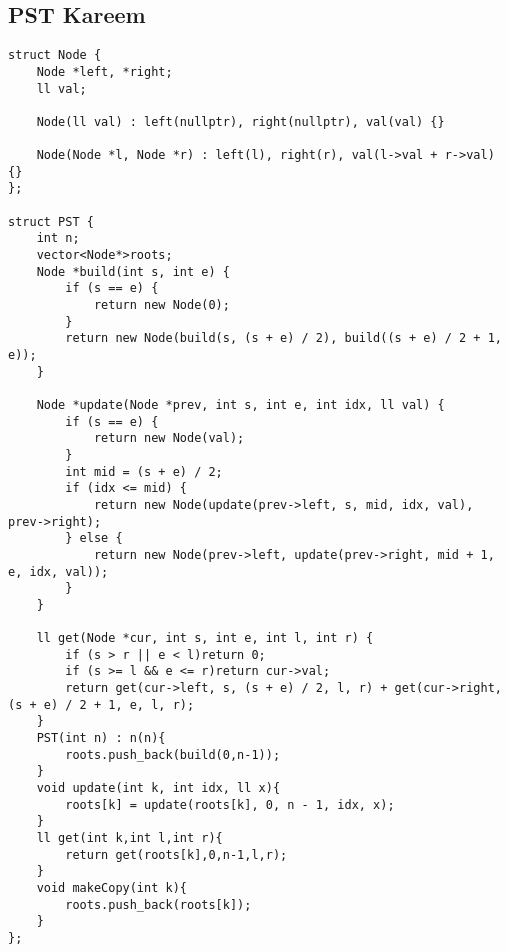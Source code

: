 \documentclass{article}
\begin{document}
\subsection{PST Kareem}
\begin{verbatim}
struct Node {
    Node *left, *right;
    ll val;

    Node(ll val) : left(nullptr), right(nullptr), val(val) {}

    Node(Node *l, Node *r) : left(l), right(r), val(l->val + r->val) {}
};

struct PST {
    int n;
    vector<Node*>roots;
    Node *build(int s, int e) {
        if (s == e) {
            return new Node(0);
        }
        return new Node(build(s, (s + e) / 2), build((s + e) / 2 + 1, e));
    }

    Node *update(Node *prev, int s, int e, int idx, ll val) {
        if (s == e) {
            return new Node(val);
        }
        int mid = (s + e) / 2;
        if (idx <= mid) {
            return new Node(update(prev->left, s, mid, idx, val), prev->right);
        } else {
            return new Node(prev->left, update(prev->right, mid + 1, e, idx, val));
        }
    }

    ll get(Node *cur, int s, int e, int l, int r) {
        if (s > r || e < l)return 0;
        if (s >= l && e <= r)return cur->val;
        return get(cur->left, s, (s + e) / 2, l, r) + get(cur->right, (s + e) / 2 + 1, e, l, r);
    }
    PST(int n) : n(n){
        roots.push_back(build(0,n-1));
    }
    void update(int k, int idx, ll x){
        roots[k] = update(roots[k], 0, n - 1, idx, x);
    }
    ll get(int k,int l,int r){
        return get(roots[k],0,n-1,l,r);
    }
    void makeCopy(int k){
        roots.push_back(roots[k]);
    }
};
\end{verbatim}
\end{document}
